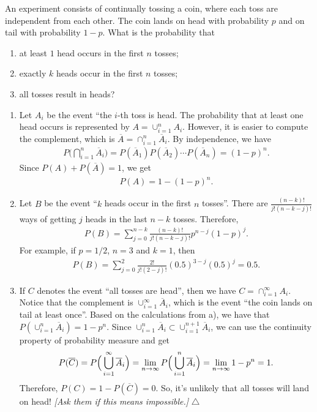 \begin{example}
An experiment consists of continually tossing a coin, where each toss are independent from each other. The coin lands on head with probability $p$ and on tail with probability $1 - p$. What is the probability that
	\begin{enumerate}[label=\alph*)]
	\item at least $1$ head occurs in the first $n$ tosses;
	\item exactly $k$ heads occur in the first $n$ tosses;
	\item all tosses result in heads?
	\end{enumerate}
\end{example}
\begin{sol*}
\begin{enumerate}[label=\alph*)]
\item Let $A_i$ be the event ``the $i$-th toss is head. The probability that at least one head occurs is represented by $A = \cup_{i = 1}^n A_i$. However, it is easier to compute the complement, which is $\overline{A} = \cap_{i = 1}^n \overline{A}_i$. By independence, we have
	\begin{align*}
	P \Big( \bigcap_{i = 1}^n \overline{A}_i \Big) = P (\overline{A}_1) P (\overline{A}_2) \cdots P (\overline{A}_n) = (1 - p)^n .
	\end{align*}
Since $P (A) + P (\overline{A}) = 1$, we get
	\begin{align*}
	P (A) = 1 - (1 - p)^n .
	\end{align*}
\item Let $B$ be the event ``$k$ heads occur in the first $n$ tosses''. There are $\frac{(n - k)!}{j! (n - k - j)!}$ ways of getting $j$ heads in the last $n - k$ tosses. Therefore, 
	\begin{align*}
	P (B) = \sum_{j = 0}^{n - k} \frac{(n - k)!}{j! (n - k - j)!} p^{n - j} (1 - p )^{j} .
\end{align*} 
For example, if $p = 1/2$, $n= 3$ and $k = 1$, then
	\begin{align*}
	P (B) = \sum_{j = 0}^2 \frac{2!}{j! (2 - j)!} (0.5)^{3 - j} (0.5)^{j} = 0.5 .
	\end{align*}
\item If $C$ denotes the event ``all tosses are head'', then we have $C = \cap_{i = 1}^\infty A_i$. Notice that the complement is $\cup_{i = 1}^\infty \overline{A}_i$, which is the event ``the coin lands on tail at least once''. Based on the calculations from a), we have that $P (\cup_{i = 1}^n \overline{A}_i ) = 1 - p^n$. Since $\cup_{i = 1}^{n} \overline{A}_i \subset \cup_{i = 1}^{n + 1} \overline{A}_i$, we can use the continuity property of probability measure and get
	\begin{align*}
	P ( \overline{C} ) = P \Big( \bigcup_{i= 1}^\infty \overline{A}_i \Big) = \lim_{n \rightarrow \infty} P \Big( \bigcup_{i= 1}^n \overline{A}_i \Big) = \lim_{n \rightarrow \infty} 1 - p^n = 1.
	\end{align*}
Therefore, $P (C) = 1 - P (\overline{C}) = 0$. So, it's unlikely that all tosses will land on head! \textit{[Ask them if this means impossible.]} \hfill $\triangle$
\end{enumerate}
\end{sol*}

